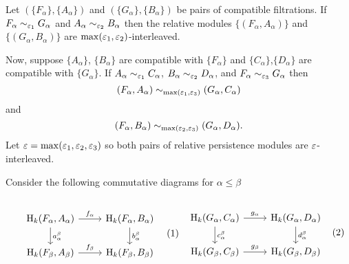 \begin{theorem}
  Let $(\{F_\alpha\}, \{A_\alpha\})$ and $(\{G_\alpha\}, \{B_\alpha\})$ be pairs of compatible filtrations.
  If $F_\alpha\sim_{\varepsilon_1} G_\alpha$ and $A_\alpha\sim_{\varepsilon_2} B_\alpha$ then the relative modules $\{(F_\alpha, A_\alpha)\}$ and $\{(G_\alpha, B_\alpha)\}$ are $\max(\varepsilon_1, \varepsilon_2)$-interleaved.
\end{theorem}

Now, suppose $\{A_\alpha\}$, $\{B_\alpha\}$ are compatible with $\{F_\alpha\}$ and $\{C_\alpha\}$,$\{D_\alpha\}$ are compatible with $\{G_\alpha\}$.
If $A_\alpha\sim_{\varepsilon_1} C_\alpha$, $B_\alpha\sim_{\varepsilon_2} D_\alpha$, and $F_\alpha\sim_{\varepsilon_3} G_\alpha$ then
\[ (F_\alpha, A_\alpha)\sim_{\max(\varepsilon_1,\varepsilon_3)} (G_\alpha, C_\alpha)\]
and
\[ (F_\alpha, B_\alpha)\sim_{\max(\varepsilon_2,\varepsilon_3)} (G_\alpha, D_\alpha).\]
Let $\varepsilon = \max(\varepsilon_1, \varepsilon_2, \varepsilon_3)$ so both pairs of relative persistence modules are $\varepsilon$-interleaved.

Consider the following commutative diagrams for $\alpha\leq\beta$

\vspace{3ex}\begin{subequations}
\begin{minipage}{0.5\textwidth}\begin{equation}\label{dgm:fab}\begin{tikzcd}
  \hom_k(F_\alpha, A_\alpha)\arrow{r}{f_\alpha}\arrow{d}{a_\alpha^\beta} &
  \hom_k(F_\alpha, B_\alpha)\arrow{d}{b_\alpha^\beta}\\
  \hom_k(F_\beta, A_\beta)\arrow{r}{f_\beta} &
  \hom_k(F_\beta, B_\beta)
\end{tikzcd}\end{equation}\end{minipage}
\begin{minipage}{0.5\textwidth}\begin{equation}\label{dgm:gcd}\begin{tikzcd}
  \hom_k(G_\alpha, C_\alpha)\arrow{r}{g_\alpha}\arrow{d}{c_\alpha^\beta} &
  \hom_k(G_\alpha, D_\alpha)\arrow{d}{d_\alpha^\beta}\\
  \hom_k(G_\beta, C_\beta)\arrow{r}{g_\beta} &
  \hom_k(G_\beta, D_\beta)
\end{tikzcd}\end{equation}\end{minipage}
\end{subequations}\vspace{3ex}


